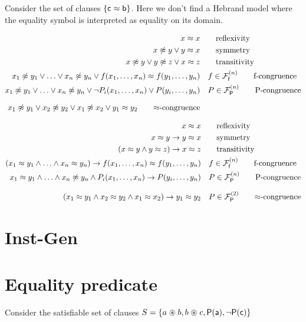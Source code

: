 \begin{example}
	Consider the set of clauses $\{ {\mathsf c} \approx {\mathsf b} \}$. Here we don't find a Hebrand model where the equality symbol is interpreted as equality on its domain.
\end{example}

\begin{align*}
	 x \mEQ x & \tag*{reflexivity} \\
	x \mNE y \lor y \mEQ x & \tag*{symmetry}\\
	x\mNE y\lor y\mNE z\lor x\mEQ z & \tag*{transitivity} \\
	x_1 \mNE y_1\lor\ldots\lor x_n \mNE y_n\lor f(x_1,\ldots,x_n)\mEQ f(y_1,\ldots,y_n) &\quad f\in\mcFfn
	\tag*{f-congruence}
	\\
	x_1\mNE y_1\lor\ldots\lor x_n\mNE y_n\lor\lnot P_i(x_1,\ldots,x_n)\lor P(y_i,\ldots,y_n) &\quad P\in\mcFPn
	\tag*{P-congruence}
	\\[0.7em]
	x_1\mNE y_1\lor x_2\mNE y_2
	\lor x_1\mNE x_2
	\lor y_1\mEQ y_2
	\tag*{$\mEQ$-congruence}
\end{align*}

\begin{align*}
	x \mEQ x & \tag*{reflexivity} 
	\\
	x \mEQ y \limp y \mEQ x & \tag*{symmetry}
	\\
	(x\mEQ y\land y\mEQ z)\limp x\mEQ z & \tag*{transitivity} 
	\\
	(x_1 \mEQ y_1\land\ldots\land x_n \mEQ y_n)\limp f(x_1,\ldots,x_n)\mEQ f(y_1,\ldots,y_n) &\quad f\in\mcFfn
	\tag*{f-congruence}
	\\
	x_1\mEQ y_1\land\ldots\land x_n\mNE y_n\land P_i(x_1,\ldots,x_n)
	\limp P(y_i,\ldots,y_n) &\quad P\in\mcFPn
	\tag*{P-congruence}
	\\[0.7em]
	(x_1\mEQ y_1
	\land x_2\mEQ y_2
	\land x_1\mEQ x_2)
	\limp y_1\mEQ y_2
	& \quad P\in\mcFPn[2]
		\tag*{$\mEQ$-congruence}
\end{align*}
	
	



\section{Inst-Gen}

\section{Equality predicate}

Consider the satisfiable set of clauses $S = \{a \mathrel{\circledast} b, b \mathrel{\circledast} c, {\mathsf P}({\mathsf a}), \lnot {\mathsf P}({\mathsf c}) \}$

